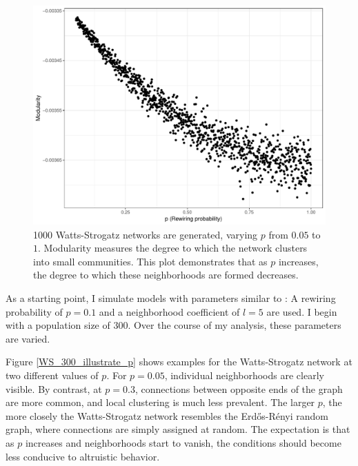 \documentclass[12pt]{article}
\begin{document}
\begin{figure}
	\centering
	\includegraphics[width=\linewidth]{../figures/illustrateWS_p_modularity.pdf}
	\caption{1000 Watts-Strogatz networks are generated, varying $p$ from $0.05$ to $1$. Modularity measures the degree to which the network clusters into small communities. This plot demonstrates that as $p$ increases, the degree to which these neighborhoods are formed decreases.}
	\label{illustrateWS_p_modularity}
\end{figure}

As a starting point, I simulate models with parameters similar to \cite{Peleteiro2014}: A rewiring probability of $p=0.1$ and a neighborhood coefficient of $l=5$ are used. I begin with a population size of 300. Over the course of my analysis, these parameters are varied.

Figure \ref{WS_300_illustrate_p} shows examples for the Watts-Strogatz network at two different values of $p$. For $p = 0.05$, individual neighborhoods are clearly visible. By contrast, at $p = 0.3$, connections between opposite ends of the graph are more common, and local clustering is much less prevalent. The larger $p$, the more closely the Watts-Strogatz network resembles the Erd\H{o}s-R\'{e}nyi random graph, where connections are simply assigned at random. The expectation is that as $p$ increases and neighborhoods start to vanish, the conditions should become less conducive to altruistic behavior.
\end{document}
